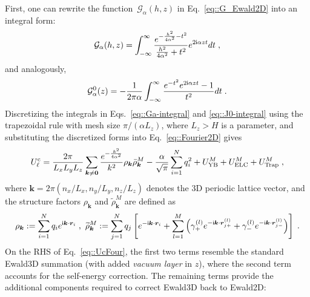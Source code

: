 First, one can rewrite the function~$\mathcal{G}_{\alpha}(h,z)$ in Eq.~\eqref{eq::G_Ewald2D} into an integral form:
\begin{equation}\label{eq::Ga-integral}
    \mathcal{G}_{\alpha}(h,z) = \int_{-\infty}^{\infty}\frac{e^{-\frac{h^2}{4\alpha^2}-t^2}}{\frac{h^2}{4\alpha^2}+t^2}e^{2\mathsf i \alpha z t} dt\;,
\end{equation}
and analogously,
\begin{equation}
\label{eq::J0-integral}
    \mathcal G_{\alpha}^{0}(z)=-\frac{1}{2\pi\alpha }\int_{-\infty}^{\infty}\frac{e^{-t^2}e^{2\mathsf i \alpha zt}-1}{t^2}dt\;.
\end{equation}
Discretizing the integrals in Eqs.~\eqref{eq::Ga-integral} and \eqref{eq::J0-integral} using the trapezoidal rule with mesh size $\pi/(\alpha L_z)$, where $L_z>H$ is a parameter, and substituting the discretized forms into Eq.~\eqref{eq::Fourier2D} gives
\begin{equation}\label{eq::UcFour}
\begin{split}
    U^{\text{c}}_{\ell} = \frac{2\pi}{L_xL_yL_z}\sum_{\bm{k}\neq \bm{0}}\frac{e^{-\frac{k^2}{4\alpha^2}}}{k^2}\rho_{\bm{k}}\bar{\rho}_{\bm{k}}^{M}-\frac{\alpha}{\sqrt{\pi}}\sum_{i=1}^{N}q_i^2+ U_{\text{YB}}^{M}+U_{\text{ELC}}^{M}+U_{\text{Trap}}^{M}\;,
\end{split}
\end{equation}
where $\bm{k}=2\pi(n_x/L_x,n_y/L_y,n_z/L_z)$ denotes the 3D periodic lattice vector, and the structure factors $\rho_{\bm{k}}$ and $\widetilde{\rho}_{\bm{k}}^{M}$ are defined as
\begin{equation}
    \rho_{\bm{k}} := \sum_{i=1}^{N}q_ie^{\mathsf i \bm{k}\cdot \bm{r}_i}\;,~
    \widetilde{\rho}_{\bm{k}}^{M} := \sum_{j=1}^{N}q_j\left[e^{-\mathsf i \bm{k}\cdot \bm{r}_i}+\sum_{l=1}^{M}\left(\gamma_{+}^{(l)}e^{-\mathsf i \bm{k}\cdot \bm{r}_{j+}^{(l)}}+\gamma_{-}^{(l)}e^{-\mathsf i \bm{k}\cdot \bm{r}_{j-}^{(l)}}\right)\right]\;.
\end{equation}
On the RHS of Eq.~\eqref{eq::UcFour}, the first two terms resemble the standard Ewald3D summation (with added \emph{vacuum layer} in $z$), where the second term accounts for the self-energy correction. 
The remaining terms provide the additional components required to correct Ewald3D back to Ewald2D:
